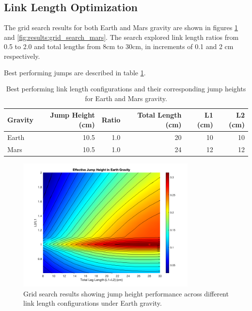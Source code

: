 \subsection{Link Length Optimization}
The grid search results for both Earth and Mars gravity are shown in figures \ref{fig:results:grid_search_earth} and \ref{fig:results:grid_search_mars}. The search explored link length ratios from 0.5 to 2.0 and total lengths from 8cm to 30cm, in increments of 0.1 and 2 cm respectively.

Best performing jumps are described in table \ref{tab:results:grid_search_earth:best_jumps}.
\begin{table}[h]
    \centering
    \begin{tabular}{lrrrrr}
        \hline
        Gravity & Jump Height (cm) & Ratio & Total Length (cm) & L1 (cm) & L2 (cm) \\
        \hline
        Earth & 10.5 & 1.0 & 20 & 10 & 10 \\
        Mars & 10.5 & 1.0 & 24 & 12 & 12 \\
        \hline
    \end{tabular}
    \caption{Best performing link length configurations and their corresponding jump heights for Earth and Mars gravity.}
    \label{tab:results:grid_search_earth:best_jumps}
\end{table}


\begin{figure}[h]
    \centering
    \includegraphics[width=0.8\textwidth]{Images/results/grid_search_results_earth_flat.png}
    \caption{Grid search results showing jump height performance across different link length configurations under Earth gravity.}
    \label{fig:results:grid_search_earth}
\end{figure}



